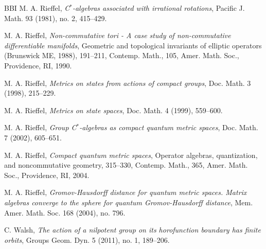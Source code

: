 \documentclass[a4paper,11pt,reqno]{amsart}
\numberwithin{equation}{section}
\numberwithin{equation}{section}
\theoremstyle{definition}
\theoremstyle{remark}
\theoremstyle{remark}
\begin{document}
\begin{thebibliography}{BBI}
 M. A. Rieffel, \emph{C$^{\ast}$-algebras
associated with irrational rotations}, Pacific J. Math. 93 (1981), no. 2, 415--429.

 M. A. Rieffel, \emph{Non-commutative tori - A case study of non-commutative differentiable manifolds}, Geometric and topological invariants of elliptic operators (Brunswick ME, 1988), 191--211, Contemp. Math., 105, Amer. Math. Soc., Providence, RI, 1990.

 M. A. Rieffel, \emph{Metrics on states from actions
of compact groups}, Doc. Math. 3 (1998), 215--229.

 M. A. Rieffel, \emph{Metrics on state spaces},
Doc. Math. 4 (1999), 559--600.

 M. A. Rieffel, \emph{Group C$^{\ast}$-algebras
as compact quantum metric spaces}, Doc. Math. 7 (2002), 605--651.

 M. A. Rieffel, \emph{Compact quantum metric spaces}, Operator algebras, quantization, and noncommutative geometry, 315–330, Contemp. Math., 365, Amer. Math. Soc., Providence, RI, 2004.

 M. A. Rieffel, \emph{Gromov-Hausdorff distance
for quantum metric spaces. Matrix algebras converge to the sphere
for quantum Gromov-Hausdorff distance}, Mem. Amer. Math. Soc. 168
(2004), no. 796.

 C. Walsh, \emph{The action of a nilpotent group
on its horofunction boundary has finite orbits}, Groups Geom. Dyn.
5 (2011), no. 1, 189--206.

\vspace{3mm}
 
\end{thebibliography}
\end{document}

